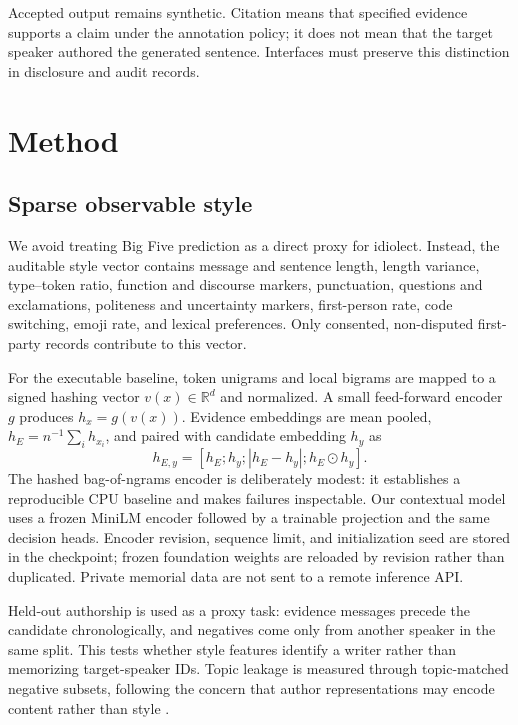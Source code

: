 \documentclass[11pt,a4paper]{article}
\begin{document}
Accepted output remains synthetic.  Citation means that specified evidence
supports a claim under the annotation policy; it does not mean that the target
speaker authored the generated sentence.  Interfaces must preserve this
distinction in disclosure and audit records.

\section{Method}

\subsection{Sparse observable style}

We avoid treating Big Five prediction as a direct proxy for idiolect.  Instead,
the auditable style vector contains message and sentence length, length
variance, type--token ratio, function and discourse markers, punctuation,
questions and exclamations, politeness and uncertainty markers, first-person
rate, code switching, emoji rate, and lexical preferences.  Only consented,
non-disputed first-party records contribute to this vector.

For the executable baseline, token unigrams and local bigrams are mapped to a
signed hashing vector $v(x)\in\mathbb{R}^d$ and normalized.  A small feed-forward
encoder $g$ produces $h_x=g(v(x))$.  Evidence embeddings are mean pooled,
$h_E=n^{-1}\sum_i h_{x_i}$, and paired with candidate embedding $h_y$ as
\begin{equation}
 h_{E,y}=[h_E;h_y;|h_E-h_y|;h_E\odot h_y].
\end{equation}
The hashed bag-of-ngrams encoder is deliberately modest: it establishes a
reproducible CPU baseline and makes failures inspectable.  Our contextual
model uses a frozen MiniLM encoder followed by a trainable projection and the
same decision heads.  Encoder revision, sequence limit, and initialization
seed are stored in the checkpoint; frozen foundation weights are reloaded by
revision rather than duplicated.  Private memorial data are not sent to a
remote inference API.

Held-out authorship is used as a proxy task: evidence messages precede the
candidate chronologically, and negatives come only from another speaker in the
same split.  This tests whether style features identify a writer rather than
memorizing target-speaker IDs.  Topic leakage is measured through topic-matched
negative subsets, following the concern that author representations may encode
content rather than style \citep{wegmann-etal-2022-author}.
\end{document}
